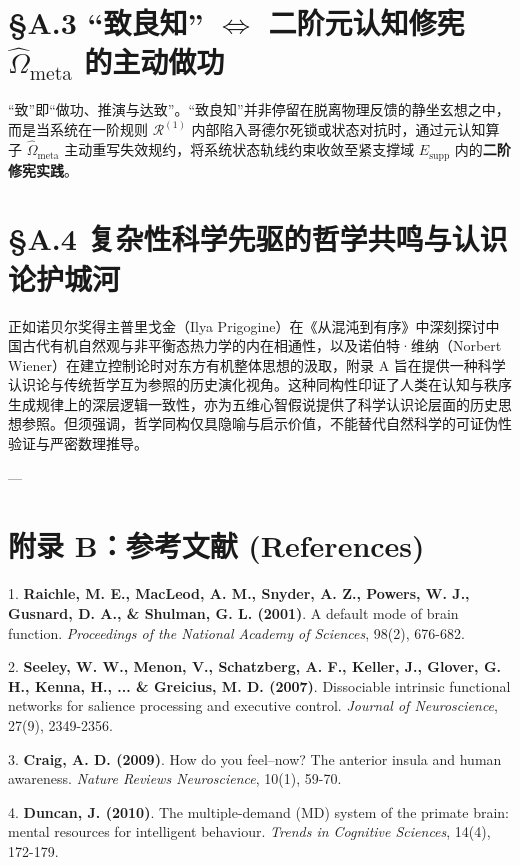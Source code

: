 \documentclass[11pt,a4paper,oneside]{ctexart}
\begin{document}
\section{§A.3 “致良知” $\Longleftrightarrow$ 二阶元认知修宪 \texorpdfstring{$\hat{\Omega}_{\text{meta}}$}{Omega\_meta} 的主动做功}
“致”即“做功、推演与达致”。“致良知”并非停留在脱离物理反馈的静坐玄想之中，而是当系统在一阶规则 $\mathcal{R}^{(1)}$ 内部陷入哥德尔死锁或状态对抗时，通过元认知算子 $\hat{\Omega}_{\text{meta}}$ 主动重写失效规约，将系统状态轨线约束收敛至紧支撑域 $E_{\text{supp}}$ 内的\textbf{二阶修宪实践}。


\section{§A.4 复杂性科学先驱的哲学共鸣与认识论护城河}
正如诺贝尔奖得主普里戈金（Ilya Prigogine）在《从混沌到有序》中深刻探讨中国古代有机自然观与非平衡态热力学的内在相通性，以及诺伯特·维纳（Norbert Wiener）在建立控制论时对东方有机整体思想的汲取，附录 A 旨在提供一种科学认识论与传统哲学互为参照的历史演化视角。这种同构性印证了人类在认知与秩序生成规律上的深层逻辑一致性，亦为五维心智假说提供了科学认识论层面的历史思想参照。但须强调，哲学同构仅具隐喻与启示价值，不能替代自然科学的可证伪性验证与严密数理推导。


---


\section{附录 B：参考文献 (References)}

1. \textbf{Raichle, M. E., MacLeod, A. M., Snyder, A. Z., Powers, W. J., Gusnard, D. A., \& Shulman, G. L. (2001)}. A default mode of brain function. \textit{Proceedings of the National Academy of Sciences}, 98(2), 676-682.

2. \textbf{Seeley, W. W., Menon, V., Schatzberg, A. F., Keller, J., Glover, G. H., Kenna, H., ... \& Greicius, M. D. (2007)}. Dissociable intrinsic functional networks for salience processing and executive control. \textit{Journal of Neuroscience}, 27(9), 2349-2356.

3. \textbf{Craig, A. D. (2009)}. How do you feel--now? The anterior insula and human awareness. \textit{Nature Reviews Neuroscience}, 10(1), 59-70.

4. \textbf{Duncan, J. (2010)}. The multiple-demand (MD) system of the primate brain: mental resources for intelligent behaviour. \textit{Trends in Cognitive Sciences}, 14(4), 172-179.
\end{document}
